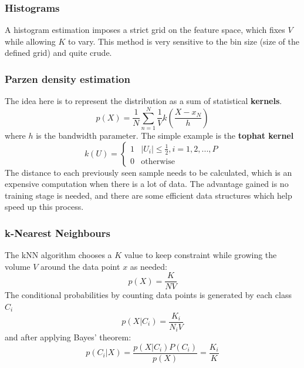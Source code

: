 \documentclass[CS5104-Notes.tex]{subfiles}
\begin{document}
\subsubsection{Histograms}
A histogram estimation imposes a strict grid on the feature space, which fixes $V$ while allowing $K$ to vary. This method is very sensitive to the bin size (size of the defined grid) and quite crude.

\subsubsection{Parzen density estimation}
The idea here is to represent the distribution as a sum of statistical \textbf{kernels}.
\begin{equation}
p(X) = \frac{1}{N}\sum_{n=1}^{N}\frac{1}{V}k(\frac{X-x_{N}}{h})
\end{equation}
where $h$ is the bandwidth parameter. The simple example is the \textbf{tophat kernel}
\begin{equation}
k(U) =
\begin{cases}
  1 & |U_{i}| \leq \frac{1}{2}, i = 1, 2, ..., P \\
  0 & \text{otherwise}
\end{cases}
\end{equation}
The distance to each previously seen sample needs to be calculated, which is an expensive computation when there is a lot of data. The advantage gained is no training stage is needed, and there are some efficient data structures which help speed up this process.

\subsubsection{k-Nearest Neighbours}
The kNN algorithm chooses a $K$ value to keep constraint while growing the volume $V$ around the data point $x$ as needed:
\begin{equation}
p(X) = \frac{K}{NV}
\end{equation}
The conditional probabilities by counting data points is generated by each class $C_{i}$
\begin{equation}
p(X | C_{i}) = \frac{K_{i}}{N_{i}V}
\end{equation}
and after applying Bayes' theorem:
\begin{equation}
p(C_{i} | X) = \frac{p(X|C_{i})P(C_{i})}{p(X)} = \frac{K_{i}}{K}
\end{equation}
\end{document}
